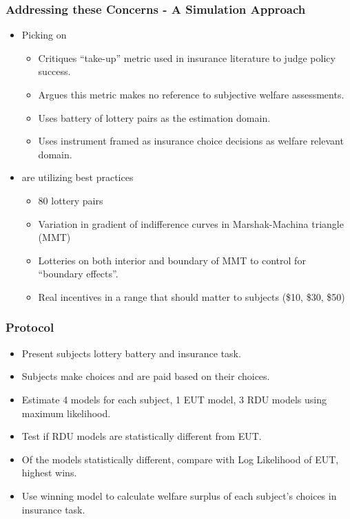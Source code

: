 \documentclass{beamer}
\begin{document}
\begin{frame}
	\frametitle{Addressing these Concerns - A Simulation Approach}
\begin{itemize}
	\item Picking on \textcite{Harrison2016}
		\begin{itemize}
			\item Critiques \enquote{take-up} metric used in insurance literature to judge policy success.
			\item Argues this metric makes no reference to subjective welfare assessments.
			\item Uses battery of lottery pairs as the estimation domain.
			\item Uses instrument framed as insurance choice decisions as welfare relevant domain.
		\end{itemize}
	\item \textcite{Harrison2016} are utilizing best practices
		\begin{itemize}
			\item 80 lottery pairs
			\item Variation in gradient of indifference curves in Marshak-Machina triangle (MMT)
			\item Lotteries on both interior and boundary of MMT to control for \enquote{boundary effects}.
			\item Real incentives in a range that should matter to subjects (\$10, \$30, \$50)
		\end{itemize}
\end{itemize}
\end{frame}

\begin{frame}
\frametitle{\textcite{Harrison2016} Protocol}
\begin{itemize}
	\item Present subjects lottery battery and insurance task.
	\item Subjects make choices and are paid based on their choices.
	\item Estimate 4 models for each subject, 1 EUT model, 3 RDU models using maximum likelihood.
	\item Test if RDU models are statistically different from EUT.
	\item Of the models statistically different, compare with Log Likelihood of EUT, highest wins.
	\item Use winning model to calculate welfare surplus of each subject's choices in insurance task.
\end{itemize}
\end{frame}
\end{document}
